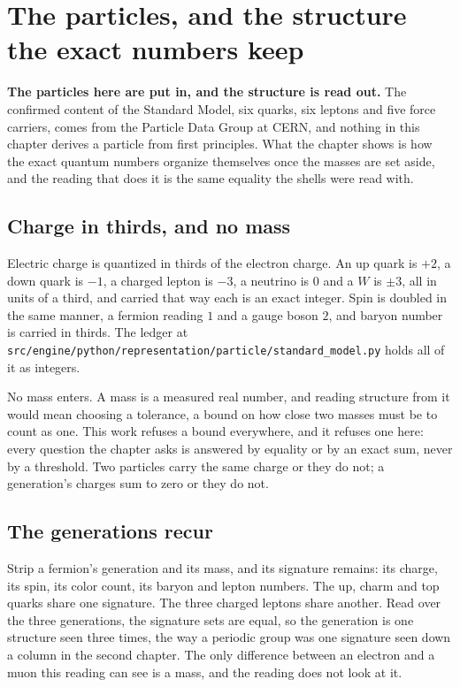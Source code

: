 \chapter{The particles, and the structure the exact numbers keep}

\textbf{The particles here are put in, and the structure is read out.} The confirmed content of the
Standard Model, six quarks, six leptons and five force carriers, comes from the Particle Data Group at
CERN, and nothing in this chapter derives a particle from first principles. What the chapter shows is
how the exact quantum numbers organize themselves once the masses are set aside, and the reading that
does it is the same equality the shells were read with.

\section{Charge in thirds, and no mass}

Electric charge is quantized in thirds of the electron charge. An up quark is $+2$, a down quark is
$-1$, a charged lepton is $-3$, a neutrino is $0$ and a $W$ is $\pm 3$, all in units of a third, and
carried that way each is an exact integer. Spin is doubled in the same manner, a fermion reading $1$
and a gauge boson $2$, and baryon number is carried in thirds. The ledger at
\texttt{src/\allowbreak{}engine/\allowbreak{}python/\allowbreak{}representation/\allowbreak{}particle/\allowbreak{}standard\_model.py}
holds all of it as integers.

No mass enters. A mass is a measured real number, and reading structure from it would mean choosing a
tolerance, a bound on how close two masses must be to count as one. This work refuses a bound
everywhere, and it refuses one here: every question the chapter asks is answered by equality or by an
exact sum, never by a threshold. Two particles carry the same charge or they do not; a generation's
charges sum to zero or they do not.

\section{The generations recur}

Strip a fermion's generation and its mass, and its signature remains: its charge, its spin, its
color count, its baryon and lepton numbers. The up, charm and top quarks share one signature. The three
charged leptons share another. Read over the three generations, the signature sets are equal, so the
generation is one structure seen three times, the way a periodic group was one signature seen down a
column in the second chapter. The only difference between an electron and a muon this reading can see is
a mass, and the reading does not look at it.

